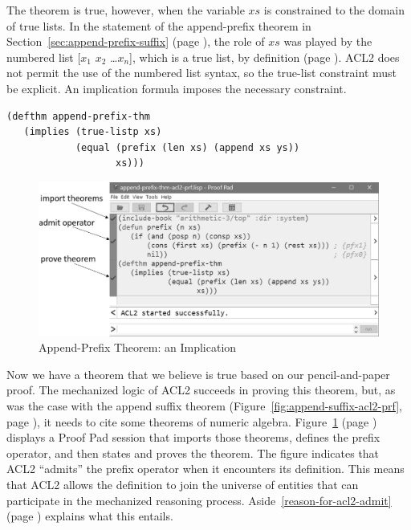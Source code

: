 The theorem is true, however, when the variable $xs$ is
constrained to the domain of true lists.
In the statement of the append-prefix theorem in
Section~\ref{sec:append-prefix-suffix} (page \pageref{append-prefix-thm-predicate}),
the role of $xs$ was played by the numbered list
[$x_1$ $x_2$ \dots $x_n$], which is a true list, by definition
(page \pageref{numbered-list-interpretation}).
ACL2 does not permit the use of the numbered list syntax,
so the true-list constraint must be explicit.
An implication formula imposes the necessary constraint.

\begin{Verbatim}
(defthm append-prefix-thm
   (implies (true-listp xs)
            (equal (prefix (len xs) (append xs ys))
                   xs)))
\end{Verbatim}

\begin{figure}
\begin{center}
\includegraphics[scale=0.43]{images/append-prefix-thm-acl2-prf-bw.png}
\end{center}
\caption{Append-Prefix Theorem: an Implication}
\label{fig:append-prefix-acl2-prf}
\end{figure}

Now we have a theorem that we believe is true
based on our pencil-and-paper proof.
The mechanized logic of ACL2
succeeds in proving this theorem, but, as was the case with
the append suffix theorem
(Figure~\ref{fig:append-suffix-acl2-prf}, page \pageref{fig:append-suffix-acl2-prf}),
it needs to cite some theorems of numeric algebra.
Figure~\ref{fig:append-prefix-acl2-prf} (page \pageref{fig:append-prefix-acl2-prf})
displays a Proof Pad session that imports those theorems,
defines the prefix operator, and then states and proves the theorem.
The figure indicates that ACL2
``admits'' the prefix operator when it encounters its definition.
This means that ACL2 allows the definition to join
the universe of entities that can participate in
the mechanized reasoning process.
Aside~\ref{reason-for-acl2-admit} (page \pageref{reason-for-acl2-admit})
explains what this entails.

